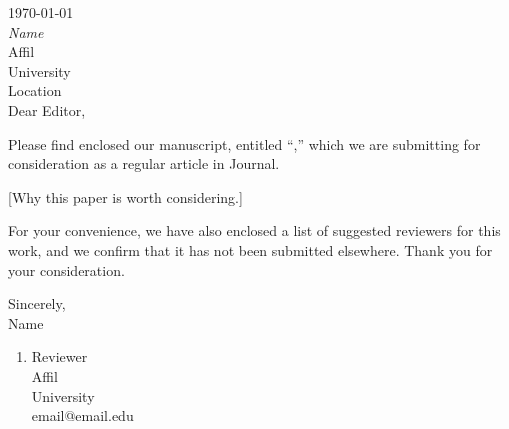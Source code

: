 \documentclass[11pt, letterpaper]{article}
\begin{document}
\today\\

{\itshape Name}\\
Affil\\
University\\
Location\\


Dear Editor,

Please find enclosed our manuscript, entitled ``,'' which we are submitting for consideration as a regular article in Journal.

[Why this paper is worth considering.]

For your convenience, we have also enclosed a list of suggested reviewers for this work, and we confirm that it has not been submitted elsewhere.
Thank you for your consideration.

\hspace*{4.in}Sincerely,\\ [\medskipamount]
\hspace*{4.in}Name\\


\clearpage

\begin{enumerate}
    \item Reviewer\\Affil\\University\\email@email.edu
\end{enumerate}
\end{document}
